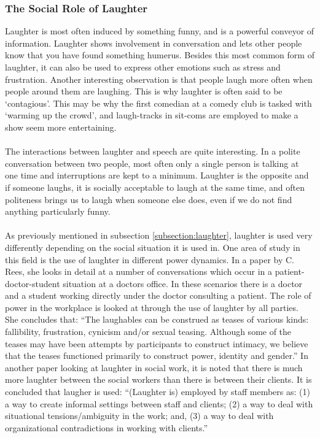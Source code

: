 \documentclass[a4paper,11pt,notitlepage]{article}
\begin{document}
\subsubsection{The Social Role of Laughter}
Laughter is most often induced by something funny, and is a powerful conveyor of information. Laughter shows involvement in conversation and lets other people know that you have found something humerus. Besides this most common form of laughter, it can also be used to express other emotions such as stress and frustration. Another interesting observation is that people laugh more often when people around them are laughing. This is why laughter is often said to be `contagious'. This may be why the first comedian at a comedy club is tasked with `warming up the crowd', and laugh-tracks in sit-coms are employed to make a show seem more entertaining.\\
\\
The interactions between laughter and speech are quite interesting. In a polite conversation between two people, most often only a single person is talking at one time and interruptions are kept to a minimum. Laughter is the opposite and if someone laughs, it is socially acceptable to laugh at the same time, and often politeness brings us to laugh when someone else does, even if we do not find anything particularly funny.\cite{dupont2014acoustic}\\
\\
As previously mentioned in subsection \ref{subsection:laughter}, laughter is used very differently depending on the social situation it is used in. One area of study in this field is the use of laughter in different power dynamics. In a paper by C. Rees, she looks in detail at a number of conversations which occur in a patient-doctor-student situation at a doctors office. In these scenarios there is a doctor and a student working directly under the doctor consulting a patient. The role of power in the workplace is looked at through the use of laughter by all parties. She concludes that: ``The laughables can be construed as teases of various kinds: fallibility, frustration, cynicism and/or sexual teasing. Although some of the teases may have been attempts by participants to construct intimacy, we believe that the teases functioned primarily to construct power, identity and gender.''\cite{rees2010should} In another paper looking at laughter in social work, it is noted that there is much more laughter between the social workers than there is between their clients. It is concluded that laugher is used: ``(Laughter is) employed by staff members as: (1) a way to create informal settings between staff and clients; (2) a way to deal with situational tensions/ambiguity in the work; and, (3) a way to deal with organizational contradictions in working with clients.''\cite{mik2007interpersonal}\\
\end{document}
